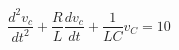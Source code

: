 \documentclass[preview]{standalone}
\begin{document}
\begin{center}
\[\frac{d^2v_c}{dt^2} + \frac{R}{L} \frac{dv_c}{dt} + \frac{1}{LC}v_C = 10\]
\end{center}
\end{document}
